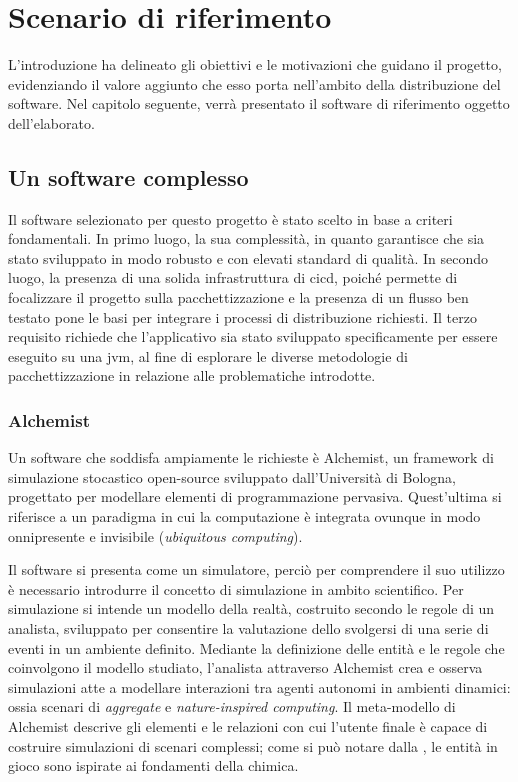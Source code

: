 
\chapter{Scenario di riferimento}\label{chap:scenery}

L'introduzione ha delineato gli obiettivi e le motivazioni che guidano il progetto, evidenziando il valore aggiunto che esso porta nell'ambito della distribuzione del software. Nel capitolo seguente, verrà presentato il software di riferimento oggetto dell'elaborato.

\section{Un software complesso}\label{sec:alchemist}
Il software selezionato per questo progetto è stato scelto in base a criteri fondamentali. In primo luogo, la sua complessità, in quanto garantisce che sia stato sviluppato in modo robusto e con elevati standard di qualità. In secondo luogo, la presenza di una solida infrastruttura di \ac{cicd}, poiché permette di focalizzare il progetto sulla pacchettizzazione e la presenza di un flusso ben testato pone le basi per integrare i processi di distribuzione richiesti. Il terzo requisito richiede che l'applicativo sia stato sviluppato specificamente per essere eseguito su una \ac{jvm}, al fine di esplorare le diverse metodologie di pacchettizzazione in relazione alle problematiche introdotte.

\subsection{Alchemist}

Un software che soddisfa ampiamente le richieste è Alchemist\cite{Pianini_2013}, un framework di simulazione stocastico open-source sviluppato dall'Università di Bologna, progettato per modellare elementi di programmazione pervasiva. Quest'ultima si riferisce a un paradigma in cui la computazione è integrata ovunque in modo onnipresente e invisibile (\textit{ubiquitous computing}). 


Il software si presenta come un simulatore, perciò per comprendere il suo utilizzo è necessario introdurre il concetto di simulazione in ambito scientifico. Per simulazione si intende un modello della realtà, costruito secondo le regole di un analista, sviluppato per consentire la valutazione dello svolgersi di una serie di eventi in un ambiente definito. Mediante la definizione delle entità e le regole che coinvolgono il modello studiato, l'analista attraverso Alchemist crea e osserva simulazioni atte a modellare interazioni tra agenti autonomi in ambienti dinamici: ossia scenari di \textit{aggregate} e \textit{nature-inspired computing}. Il meta-modello di Alchemist descrive gli elementi e le relazioni con cui l'utente finale è capace di costruire simulazioni di scenari complessi; come si può notare dalla , le entità in gioco sono ispirate ai fondamenti della chimica. 


